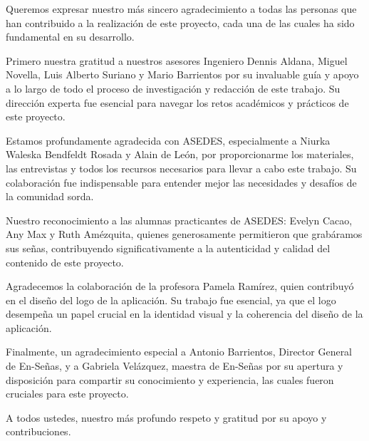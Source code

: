 Queremos expresar nuestro más sincero agradecimiento a todas las personas que han contribuido a la realización de este proyecto, cada una de las cuales ha sido fundamental en su desarrollo.

Primero nuestra gratitud a nuestros asesores Ingeniero Dennis Aldana, Miguel Novella, Luis Alberto Suriano y Mario Barrientos por su invaluable guía y apoyo a lo largo de todo el proceso de investigación y redacción de este trabajo. Su dirección experta fue esencial para navegar los retos académicos y prácticos de este proyecto.

Estamos profundamente agradecida con ASEDES, especialmente a Niurka Waleska Bendfeldt Rosada y Alain de León, por proporcionarme los materiales, las entrevistas y todos los recursos necesarios para llevar a cabo este trabajo. Su colaboración fue indispensable para entender mejor las necesidades y desafíos de la comunidad sorda.

Nuestro reconocimiento a las alumnas practicantes de ASEDES: Evelyn Cacao, Any Max y Ruth Amézquita, quienes generosamente permitieron que grabáramos sus señas, contribuyendo significativamente a la autenticidad y calidad del contenido de este proyecto.

Agradecemos la colaboración de la profesora Pamela Ramírez, quien contribuyó en el diseño del logo de la aplicación. Su trabajo fue esencial, ya que el logo desempeña un papel crucial en la identidad visual y la coherencia del diseño de la aplicación.

Finalmente, un agradecimiento especial a Antonio Barrientos, Director General de En-Señas, y a Gabriela Velázquez, maestra de En-Señas por su apertura y disposición para compartir su conocimiento y experiencia, las cuales fueron cruciales para este proyecto.

A todos ustedes, nuestro más profundo respeto y gratitud por su apoyo y contribuciones.